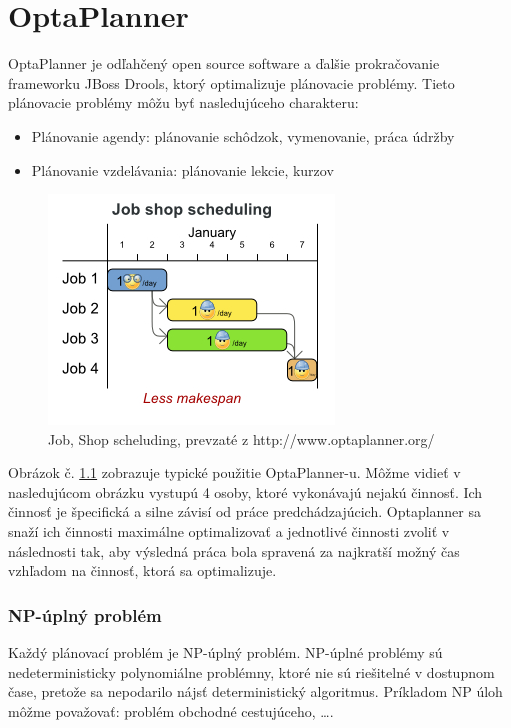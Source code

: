 \chapter{OptaPlanner}
OptaPlanner je odľahčený open source software a ďalšie prokračovanie frameworku JBoss Drools, ktorý optimalizuje plánovacie problémy.\cite{optaweb} Tieto plánovacie problémy môžu byť nasledujúceho charakteru: 
\begin{itemize}
\item Plánovanie agendy: plánovanie schôdzok, vymenovanie, práca údržby
\item Plánovanie vzdelávania: plánovanie lekcie, kurzov
\end{itemize}
\begin{figure}[htb]

\begin{center}

\includegraphics[scale=0.5]{fig/useCaseOverview.jpg} 
\caption{Job, Shop scheluding, prevzaté z http://www.optaplanner.org/ }
\label{obrazokUseCase}

\end{center}

\end{figure}
Obrázok č. \ref{obrazokUseCase} zobrazuje typické použitie OptaPlanner-u. Môžme vidieť v nasledujúcom obrázku vystupú 4 osoby, ktoré vykonávajú nejakú činnosť. Ich činnosť je špecifická a silne závisí od práce predchádzajúcich. Optaplanner sa snaží ich činnosti maximálne optimalizovať a jednotlivé činnosti zvoliť v následnosti tak, aby výsledná práca bola spravená za najkratší možný čas vzhľadom na činnosť, ktorá sa optimalizuje.


\subsection{NP-úplný problém}
Každý plánovací problém je NP-úplný problém.\cite{npbook} NP-úplné problémy sú nedeterministicky polynomiálne problémny, ktoré nie sú riešitelné v dostupnom čase, pretože sa nepodarilo nájsť deterministický algoritmus. Príkladom NP úloh môžme považovať: problém obchodné cestujúceho, \ldots .

